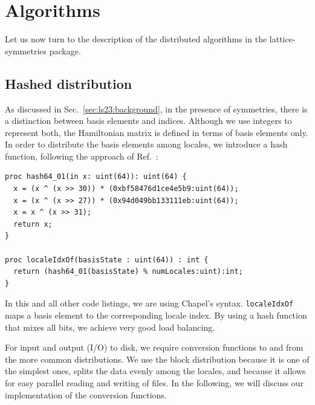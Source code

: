 \section{Algorithms}\label{sec:ls23:algorithms}

Let us now turn to the description of the distributed algorithms in the lattice-symmetries package.

\subsection{Hashed distribution}

As discussed in Sec.~\ref{sec:ls23:background}, in the presence of symmetries, there is a distinction between basis elements and indices. Although we use integers to represent both, the Hamiltonian matrix is defined in terms of basis elements only. In order to distribute the basis elements among locales, we introduce a hash function, following the approach of Ref.~\cite{Wietek2018subla}:
\begin{verbatim}
proc hash64_01(in x: uint(64)): uint(64) {
  x = (x ^ (x >> 30)) * (0xbf58476d1ce4e5b9:uint(64));
  x = (x ^ (x >> 27)) * (0x94d049bb133111eb:uint(64));
  x = x ^ (x >> 31);
  return x;
}

proc localeIdxOf(basisState : uint(64)) : int {
  return (hash64_01(basisState) % numLocales:uint):int;
}
\end{verbatim}
In this and all other code listings, we are using Chapel's syntax. \verb|localeIdxOf| maps a basis element to the corresponding locale index. By using a hash function that mixes all bits, we achieve very good load balancing.

For input and output (I/O) to disk, we require conversion functions to and from the more common distributions. We use the block distribution because it is one of the simplest ones, splits the data evenly among the locales, and because it allows for easy parallel reading and writing of files. In the following, we will discuss our implementation of the conversion functions.

